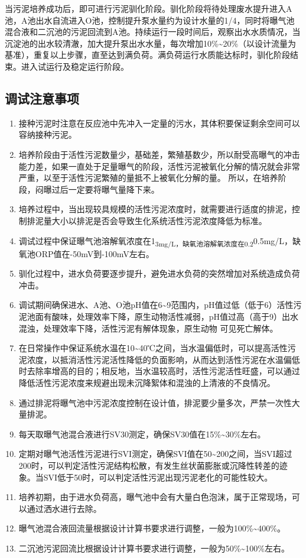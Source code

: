 \documentclass[]{book}
\begin{document}
当污泥培养成功后，即可进行污泥驯化阶段。驯化阶段将待处理废水提升进入A池，A池出水自流进入O池，控制提升泵水量约为设计水量的1/4，同时将曝气池混合液和二沉池的污泥回流到A池。持续运行一段时间后，观察出水水质情况，当沉淀池的出水较清澈，加大提升泵出水水量，每次增加10\%\textasciitilde{}20\%（以设计流量为基准），重复以上步骤，直至达到满负荷。满负荷运行水质能达标时，驯化阶段结束。进入试运行及稳定运行阶段。

\subsection{调试注意事项}

\begin{enumerate}
\def\labelenumi{(\arabic{enumi})}
\item
  接种污泥时注意在反应池中先冲入一定量的污水，其体积要保证剩余空间可以容纳接种污泥。
\item
  培养阶段由于活性污泥数量少，基础差，繁殖基数少，所以耐受高曝气的冲击能力差，如果一直处于足量曝气的阶段，活性污泥被氧化分解的情况就会非常严重，以至于活性污泥繁殖的量抵不上被氧化分解的量。
  所以，在培养阶段，闷曝过后一定要将曝气量降下来。
\item
  培养过程中，当出现较具规模的活性污泥浓度时，就需要进行适度的排泥，控制排泥量大小以排泥是否会导致生化系统活性污泥浓度降低为标准。
\item
  调试过程中保证曝气池溶解氧浓度在1\textsubscript{3mg/L，缺氧池溶解氧浓度在0.2}0.5mg/L，缺氧池ORP值在-50mV到-100mV左右。
\item
  驯化过程中，进水负荷要逐步提升，避免进水负荷的突然增加对系统造成负荷冲击。
\item
  调试期间确保进水、A池、O池pH值在6\textasciitilde{}9范围内，pH值过低（低于6）活性污泥池面有酸味，处理效率下降，原生动物活性减弱，pH值过高（高于9）出水混浊，处理效率下降，活性污泥有解体现象，原生动物
  可见死亡解体。
\item
  在日常操作中保证系统水温在10\textasciitilde{}40℃之间，当水温偏低时，可以提高活性污泥浓度，以抵消活性污泥活性降低的负面影响，从而达到活性污泥在水温偏低时去除率增高的目的；相反地，当水温较高时，活性污泥活性旺盛，可以通过降低活性污泥浓度来规避出现未沉降絮体和混浊的上清液的不良情况。
\item
  通过排泥将曝气池中污泥浓度控制在设计值，排泥要少量多次，严禁一次性大量排泥。
\item
  每天取曝气池混合液进行SV30测定，确保SV30值在15\%\textasciitilde{}30\%左右。
\item
  定期对曝气池活性污泥进行SVI测定，确保SVI值在50\textasciitilde{}200之间，当SVI超过200时，可以判定活性污泥结构松散，有发生丝状菌膨胀或沉降性转差的迹象。当SVI低于50时，可以判定活性污泥出现污泥老化的可能性较大。
\item
  培养初期，由于进水负荷高，曝气池中会有大量白色泡沫，属于正常现场，可以通过洒水进行去除。
\item
  曝气池混合液回流量根据设计计算书要求进行调整，一般为100\%\textasciitilde{}400\%。
\item
  二沉池污泥回流比根据设计计算书要求进行调整，一般为50\%\textasciitilde{}100\%左右。
\end{enumerate}
\end{document}
